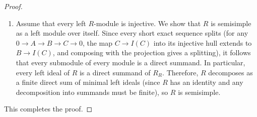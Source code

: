 \begin{proof}
\begin{enumerate}
        \item Assume that every left $R$-module is injective. We show that $R$ is semisimple as a left module over itself. Since every short exact sequence splits (for any $0 \to A \to B \to C \to 0$, the map $C \to I(C)$ into its injective hull extends to $B \to I(C)$, and composing with the projection gives a splitting), it follows that every submodule of every module is a direct summand. In particular, every left ideal of $R$ is a direct summand of $R_R$. Therefore, $R$ decomposes as a finite direct sum of minimal left ideals (since $R$ has an identity and any decomposition into summands must be finite), so $R$ is semisimple.
    \end{enumerate}

    This completes the proof.
\end{proof}